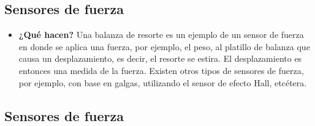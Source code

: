 \subsection*{Sensores de fuerza} 
\begin{itemize}
	\item \textbf{¿Qué hacen?} Una balanza de resorte es un ejemplo de un sensor de fuerza en donde se aplica una fuerza, por ejemplo, el peso, al platillo de balanza que causa un desplazamiento, es decir, el resorte se estira. El desplazamiento es entonces una medida de la fuerza. Existen otros tipos de sensores de fuerza, por ejemplo, con base en galgas, utilizando el sensor de efecto Hall, etcétera. 
\end{itemize}
\subsection{Sensores de fuerza}

